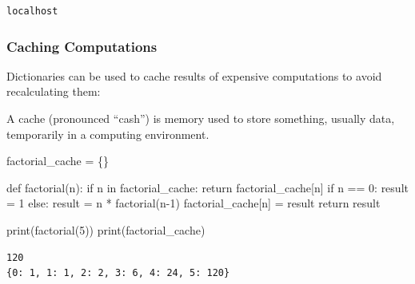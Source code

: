 \documentclass[
  letterpaper,
  DIV=11,
  numbers=noendperiod]{scrreprt}
\newenvironment{Shaded}{\begin{snugshade}}{\end{snugshade}}
\newcommand{\BuiltInTok}[1]{\textcolor[rgb]{0.00,0.23,0.31}{#1}}
\newcommand{\ControlFlowTok}[1]{\textcolor[rgb]{0.00,0.23,0.31}{#1}}
\newcommand{\DecValTok}[1]{\textcolor[rgb]{0.68,0.00,0.00}{#1}}
\newcommand{\KeywordTok}[1]{\textcolor[rgb]{0.00,0.23,0.31}{#1}}
\newcommand{\NormalTok}[1]{\textcolor[rgb]{0.00,0.23,0.31}{#1}}
\newcommand{\OperatorTok}[1]{\textcolor[rgb]{0.37,0.37,0.37}{#1}}
\begin{document}
\begin{verbatim}
localhost
\end{verbatim}

\hypertarget{caching-computations}{%
\subsubsection{Caching Computations}\label{caching-computations}}

Dictionaries can be used to cache results of expensive computations to
avoid recalculating them:

\begin{tcolorbox}[enhanced jigsaw, coltitle=black, colback=white, bottomrule=.15mm, arc=.35mm, titlerule=0mm, opacitybacktitle=0.6, toptitle=1mm, left=2mm, toprule=.15mm, opacityback=0, bottomtitle=1mm, title=\textcolor{quarto-callout-note-color}{\faInfo}\hspace{0.5em}{cache}, rightrule=.15mm, colframe=quarto-callout-note-color-frame, breakable, colbacktitle=quarto-callout-note-color!10!white, leftrule=.75mm]

A cache (pronounced ``cash'') is memory used to store something, usually
data, temporarily in a computing environment.

\end{tcolorbox}

\begin{Shaded}
\begin{Highlighting}[]
\NormalTok{factorial\_cache }\OperatorTok{=}\NormalTok{ \{\}}

\KeywordTok{def}\NormalTok{ factorial(n):}
    \ControlFlowTok{if}\NormalTok{ n }\KeywordTok{in}\NormalTok{ factorial\_cache:}
        \ControlFlowTok{return}\NormalTok{ factorial\_cache[n]}
    \ControlFlowTok{if}\NormalTok{ n }\OperatorTok{==} \DecValTok{0}\NormalTok{:}
\NormalTok{        result }\OperatorTok{=} \DecValTok{1}
    \ControlFlowTok{else}\NormalTok{:}
\NormalTok{        result }\OperatorTok{=}\NormalTok{ n }\OperatorTok{*}\NormalTok{ factorial(n}\OperatorTok{{-}}\DecValTok{1}\NormalTok{)}
\NormalTok{    factorial\_cache[n] }\OperatorTok{=}\NormalTok{ result}
    \ControlFlowTok{return}\NormalTok{ result}

\BuiltInTok{print}\NormalTok{(factorial(}\DecValTok{5}\NormalTok{))  }
\BuiltInTok{print}\NormalTok{(factorial\_cache)}
\end{Highlighting}
\end{Shaded}

\begin{verbatim}
120
{0: 1, 1: 1, 2: 2, 3: 6, 4: 24, 5: 120}
\end{verbatim}
\end{document}

